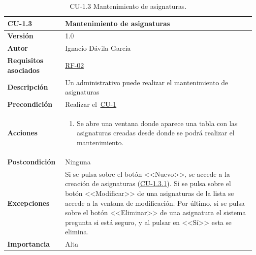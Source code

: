 \begin{table}[p]
\label{table:CU-1.3}
	\centering
	\begin{tabularx}{\linewidth}{ p{} p{} }
		\toprule
		\textbf{CU-1.3}    & \textbf{Mantenimiento de asignaturas}\\
		\toprule
		\textbf{Versión}              & 1.0    \\
		\textbf{Autor}                & Ignacio Dávila García \\
		\textbf{Requisitos asociados} & \hyperref[itm:RF2]{RF-02} \\
		\textbf{Descripción}          & Un administrativo puede realizar el mantenimiento de asignaturas \\
		\textbf{Precondición}         & Realizar el~\hyperref[table:CU-1]{CU-1} \\
		\textbf{Acciones}             &
		\begin{enumerate}
			\def\labelenumi{\arabic{enumi}.}
			\tightlist
			\item Se abre una ventana donde aparece una tabla con las asignaturas creadas desde donde se podrá realizar el mantenimiento.
		\end{enumerate}\\
		\textbf{Postcondición}        & Ninguna \\
		\textbf{Excepciones}          & Si se pulsa sobre el botón <<Nuevo>>, se accede a la creación de asignaturas (\hyperref[table:CU-1.3.1]{CU-1.3.1}). Si se pulsa sobre el botón <<Modificar>> de una asignaturas de la lista se accede a la ventana de modificación. Por último, si se pulsa sobre el botón <<Eliminar>> de una asignatura el sistema pregunta si está seguro, y al pulsar en <<Sí>> esta se elimina. \\
		\textbf{Importancia}          & Alta \\
		\bottomrule
	\end{tabularx}
	\caption{CU-1.3 Mantenimiento de asignaturas.}
\end{table}
\FloatBarrier

